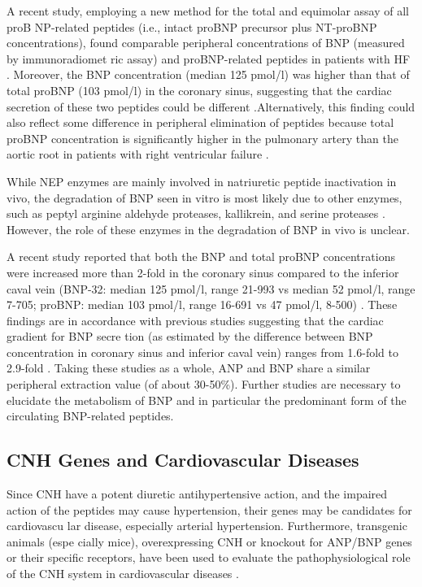\documentclass[14pt,a4paper,onecolumn]{extarticle}
\begin{document}
A recent study, employing a new method for the total and equimolar assay of all proB NP-related peptides (i.e., intact proBNP precursor plus NT-proBNP concentrations), found comparable peripheral concentrations of BNP (measured by immunoradiomet ric assay) and proBNP-related peptides in patients with HF \citep{206}. Moreover, the BNP concentration (median 125 pmol/l) was higher than that of total proBNP (103 pmol/l) in the coronary sinus, suggesting that the cardiac secretion of these two peptides could be different \citep{206}.Alternatively, this finding could also reflect some difference in peripheral elimination of peptides because total proBNP concentration is significantly higher in the pulmonary artery than the aortic root in patients with right ventricular failure \citep{207}.

While NEP enzymes are mainly involved in natriuretic peptide inactivation in vivo, the degradation of BNP seen in vitro is most likely due to other enzymes, such as peptyl arginine aldehyde proteases, kallikrein, and serine proteases \citep{15}. However, the role of these enzymes in the degradation of BNP in vivo is unclear.

A recent study reported that both the BNP and total proBNP concentrations were increased more than 2-fold in the coronary sinus compared to the inferior caval vein (BNP-32: median 125 pmol/l, range 21-993 vs median 52 pmol/l, range 7-705; proBNP: median 103 pmol/l, range 16-691 vs 47 pmol/l, 8-500) \citep{206}. These findings are in accordance with previous studies suggesting that the cardiac gradient for BNP secre tion (as estimated by the difference between BNP concentration in coronary sinus and inferior caval vein) ranges from 1.6-fold to 2.9-fold \citep{204} \citep{208} \citep{209} \citep{210}. Taking these studies as a whole, ANP and BNP share a similar peripheral extraction value (of about 30-50\%). Further studies are necessary to elucidate the metabolism of BNP and in particular the predominant form of the circulating BNP-related peptides.

\subsection{CNH Genes and Cardiovascular Diseases
}
Since CNH have a potent diuretic antihypertensive action, and the impaired action of the peptides may cause hypertension, their genes may be candidates for cardiovascu lar disease, especially arterial hypertension. Furthermore, transgenic animals (espe cially mice), overexpressing CNH or knockout for ANP/BNP genes or their specific receptors, have been used to evaluate the pathophysiological role of the CNH system in cardiovascular diseases \citep{251}.
\end{document}
